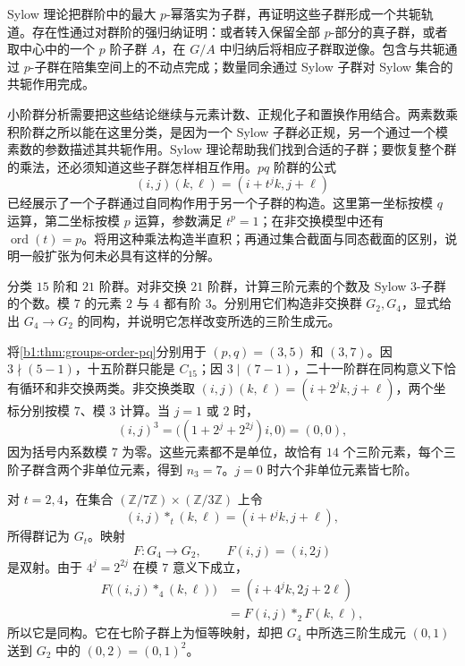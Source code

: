 \newpage
\begin{chaptersummary}
	Sylow 理论把群阶中的最大 \(p\)-幂落实为子群，再证明这些子群形成一个共轭轨道。存在性通过对群阶的强归纳证明：或者转入保留全部 \(p\)-部分的真子群，或者取中心中的一个 \(p\) 阶子群 \(A\)，在 \(G/A\) 中归纳后将相应子群取逆像。包含与共轭通过 \(p\)-子群在陪集空间上的不动点完成；数量同余通过 Sylow 子群对 Sylow 集合的共轭作用完成。

	\ProseParagraphBreak
	小阶群分析需要把这些结论继续与元素计数、正规化子和置换作用结合。两素数乘积阶群之所以能在这里分类，是因为一个 Sylow 子群必正规，另一个通过一个模素数的参数描述其共轭作用。Sylow 理论帮助我们找到合适的子群；要恢复整个群的乘法，还必须知道这些子群怎样相互作用。\(pq\) 阶群的公式
	\[
		(i,j)(k,\ell)=(i+t^jk,j+\ell)
	\]
	已经展示了一个子群通过自同构作用于另一个子群的构造。这里第一坐标按模 \(q\) 运算，第二坐标按模 \(p\) 运算，参数满足 \(t^p=1\)；在非交换模型中还有 \(\operatorname{ord}(t)=p\)。将用这种乘法构造半直积；再通过集合截面与同态截面的区别，说明一般扩张为何未必具有这样的分解。
\end{chaptersummary}

\BookExercises

\begin{exercise}\label{b1:ex:05-1}
	分类 \(15\) 阶和 \(21\) 阶群。对非交换 \(21\) 阶群，计算三阶元素的个数及 Sylow \(3\)-子群的个数。模 \(7\) 的元素 \(2\) 与 \(4\) 都有阶 \(3\)。分别用它们构造非交换群 \(G_2,G_4\)，显式给出 \(G_4\rightarrow G_2\) 的同构，并说明它怎样改变所选的三阶生成元。
\end{exercise}
\begin{solution}
	将\cref{b1:thm:groups-order-pq}分别用于 \((p,q)=(3,5)\) 和 \((3,7)\)。因 \(3\nmid(5-1)\)，十五阶群只能是 \(C_{15}\)；因 \(3\mid(7-1)\)，二十一阶群在同构意义下恰有循环和非交换两类。非交换类取 \((i,j)(k,\ell)=(i+2^jk,j+\ell)\)，两个坐标分别按模 \(7\)、模 \(3\) 计算。当 \(j=1\) 或 \(2\) 时，
	\[
		(i,j)^3=\bigl((1+2^j+2^{2j})i,0\bigr)=(0,0),
	\]
	因为括号内系数模 \(7\) 为零。这些元素都不是单位，故恰有 \(14\) 个三阶元素，每个三阶子群含两个非单位元素，得到 \(n_3=7\)。\(j=0\) 时六个非单位元素皆七阶。

	对 \(t=2,4\)，在集合 \((\mathbb Z/7\mathbb Z)\times(\mathbb Z/3\mathbb Z)\) 上令
	\[
		(i,j)*_t(k,\ell)=(i+t^jk,j+\ell),
	\]
	所得群记为 \(G_t\)。映射
	\[
		F:G_4\longrightarrow G_2,\qquad F(i,j)=(i,2j)
	\]
	是双射。由于 \(4^j=2^{2j}\) 在模 \(7\) 意义下成立，
	\[
		\begin{aligned}
			F\bigl((i,j)*_4(k,\ell)\bigr) &=(i+4^jk,2j+2\ell)\\
			&=F(i,j)*_2F(k,\ell),
		\end{aligned}
	\]
	所以它是同构。它在七阶子群上为恒等映射，却把 \(G_4\) 中所选三阶生成元 \((0,1)\) 送到 \(G_2\) 中的 \((0,2)=(0,1)^2\)。
\end{solution}

